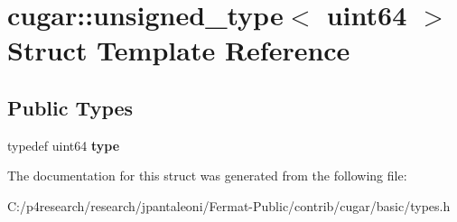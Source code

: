 \hypertarget{structcugar_1_1unsigned__type_3_01uint64_01_4}{}\section{cugar\+:\+:unsigned\+\_\+type$<$ uint64 $>$ Struct Template Reference}
\label{structcugar_1_1unsigned__type_3_01uint64_01_4}
\subsection*{Public Types}
\begin{DoxyCompactItemize}
\item 
\mbox{\label{structcugar_1_1unsigned__type_3_01uint64_01_4_ae89fa16e68549fc239383ce03715cdb0}} 
typedef uint64 {\bfseries type}
\end{DoxyCompactItemize}


The documentation for this struct was generated from the following file\+:\begin{DoxyCompactItemize}
\item 
C\+:/p4research/research/jpantaleoni/\+Fermat-\/\+Public/contrib/cugar/basic/types.\+h\end{DoxyCompactItemize}
